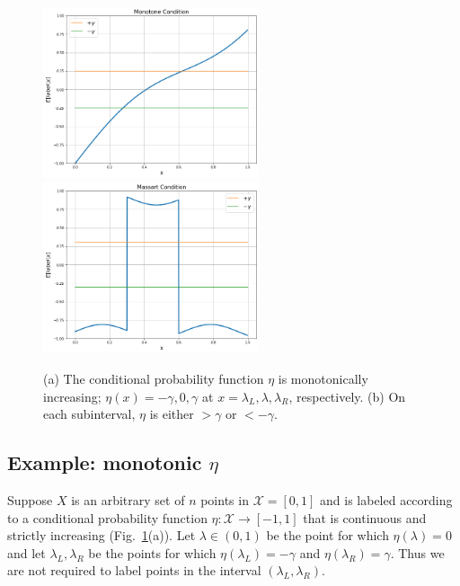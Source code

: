 \documentclass[twoside]{article}
\def\X{{\mathcal X}}
\begin{document}
\begin{figure}
\begin{center}
  \includegraphics[width=2.5in]{figures/Monotone.png}
\includegraphics[width=2.5in]{figures/Massart.png}
\end{center}
\caption{(a) The conditional probability function $\eta$ is monotonically increasing; $\eta(x) = -\gamma, 0, \gamma$ at $x = \lambda_L, \lambda, \lambda_R$, respectively. (b) On each subinterval, $\eta$ is either $> \gamma$ or $<-\gamma$.}
\label{fig:oned}
\end{figure}

\subsection{Example: monotonic $\eta$}

Suppose $X$ is an arbitrary set of $n$ points in $\X = [0,1]$ and is labeled according to a conditional probability function $\eta: \X \to [-1,1]$ that is continuous and strictly increasing (Fig.~\ref{fig:oned}(a)). Let $\lambda \in (0,1)$ be the point for which $\eta(\lambda) = 0$ and let $\lambda_L, \lambda_R$ be the points for which $\eta(\lambda_L) = -\gamma$ and $\eta(\lambda_R) = \gamma$. Thus we are not required to label points in the interval $(\lambda_L, \lambda_R)$. 




\end{document}
